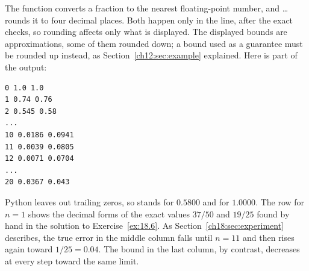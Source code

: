 The function  converts a fraction to the nearest floating-point number, and \dots{} rounds it to four decimal places. Both happen only in the  line, after the exact checks, so rounding affects only what is displayed. The displayed bounds are approximations, some of them rounded down; a bound used as a guarantee must be rounded up instead, as Section~\ref{ch12:sec:example} explained. Here is part of the output:
\par\noindent\begin{minipage}{\linewidth}
\begin{lstlisting}
0 1.0 1.0
1 0.74 0.76
2 0.545 0.58
...
10 0.0186 0.0941
11 0.0039 0.0805
12 0.0071 0.0704
...
20 0.0367 0.043
\end{lstlisting}
\end{minipage}\par
Python leaves out trailing zeros, so  stands for $0.5800$ and  for $1.0000$. The row for $n=1$ shows the decimal forms of the exact values $37/50$ and $19/25$ found by hand in the solution to Exercise~\ref{ex:18.6}. As Section~\ref{ch18:sec:experiment} describes, the true error in the middle column falls until $n=11$ and then rises again toward $1/25=0.04$. The bound in the last column, by contrast, decreases at every step toward the same limit.
